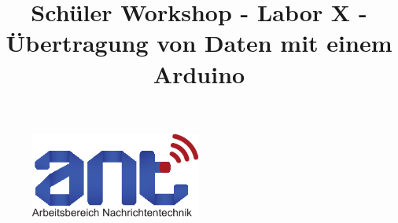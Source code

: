\documentclass[12pt,a4paper]{article}
\begin{document}

\title{Schüler Workshop - Labor X - Übertragung von Daten mit einem Arduino}
\maketitle
\begin{figure}[H]
    \centering
    \includegraphics[width=0.5\textwidth]{logos/antlogo.pdf}
\end{figure}

\author{}
\date{}



% 

% 
\end{document}
